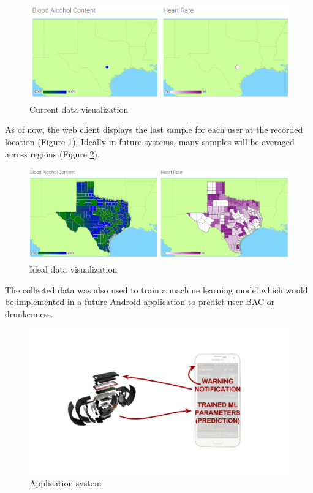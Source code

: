 \begin{figure}[H]
	\centering
	\includegraphics[scale=.35]{../figs/webpage.png}
	\caption{Current data visualization}
	\label{webpage}
\end{figure}

As of now, the web client displays the last sample for each user at the recorded location (Figure \ref{webpage}). Ideally in future systems, many samples will be averaged across regions (Figure \ref{concept}). 

\begin{figure}[H]
	\centering
	\includegraphics[scale=.23]{../figs/webconcept.png}
	\caption{Ideal data visualization}
	\label{concept}
\end{figure}

The collected data was also used to train a machine learning model which would be implemented in a future Android application to predict user BAC or drunkenness. 

\begin{figure}[H]
	\centering
	\includegraphics[scale=.30]{../figs/applicationsystem.png}
	\caption{Application system}
	\label{appsystem}
\end{figure}

